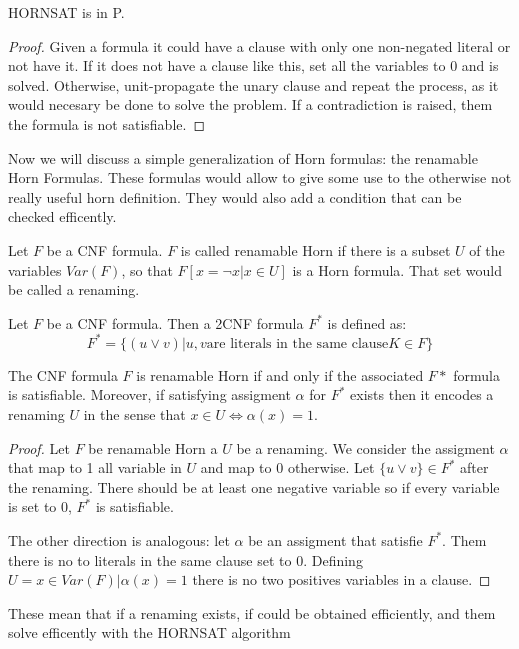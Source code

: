 \begin{proposition}
  HORNSAT is in P.
\end{proposition}
\begin{proof}
  Given a formula it could have a clause with only one non-negated literal or not have it. If it does not have a clause like this, set all the variables to 0 and is solved. Otherwise, unit-propagate the unary clause and repeat the process, as it would necesary be done to solve the problem. If a contradiction is raised, them the formula is not satisfiable.
\end{proof}


Now we will discuss a simple generalization of Horn formulas: the renamable Horn Formulas. These formulas would allow to give some use to the otherwise not really useful horn definition. They would also add a condition that can be checked efficently.

\begin{definition}
  Let $F$ be a CNF formula. $F$ is called renamable Horn if there is a subset $U$ of the variables $Var(F)$, so that $F[x=\neg x | x \in U]$ is a Horn formula.
  That set would be called a renaming.
\end{definition}


\begin{definition}
  Let $F$ be a CNF formula. Then a 2CNF formula $F^*$ is defined as:
  $$F^* = \{(u \vee v) | u,v \text{are literals in the same clause} K \in F \}$$
\end{definition}


\begin{theorem}
  The CNF formula $F$ is renamable Horn if and only if the associated $F*$ formula is satisfiable. Moreover, if satisfying assigment $\alpha$ for $F^*$  exists then it encodes a renaming $U$ in the sense that $x \in U \iff \alpha(x) = 1$.
\end{theorem}
\begin{proof}
  Let $F$ be renamable Horn a $U$ be a renaming. We consider the assigment $\alpha$ that map to 1 all variable in $U$ and map to 0 otherwise. Let $\{u\vee v\} \in F^*$ after the renaming. There should be at least one negative variable so if every variable is set to 0, $F^*$ is satisfiable.

  The other direction is analogous: let $\alpha$ be an assigment that satisfie $F^*$. Them there is no to literals in the same clause set to 0. Defining $U=  {x \in Var(F) | \alpha(x) = 1}$ there is no two positives variables in a clause.
  \end{proof}


These mean that if a renaming exists, if could be obtained efficiently, and them solve efficently with the HORNSAT algorithm







